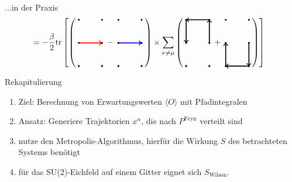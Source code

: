 \documentclass[ngerman]{beamer}
\begin{document}
\begin{frame}{...in der Praxis}
\begin{align*}
	&= -\frac{\beta}{2} \text{tr} \left[ \left( \;
	\begin{tikzpicture}[baseline=-0.5ex]
	\draw[->, very thick, red] (0,0) -> (1,0);
	\foreach \x in {0,...,1}
	{
		\foreach \y in {-1,...,1}
		{
			\fill[color=black] (\x,\y) circle (.04);
		}
	}
	\end{tikzpicture}
	\; - \;
	\begin{tikzpicture}[baseline=-0.5ex]
	\draw[->, very thick, blue] (0,0) -> (1,0);
	\foreach \x in {0,...,1}
	{
		\foreach \y in {-1,...,1}
		{
			\fill[color=black] (\x,\y) circle (.04);
		}
	}
	\end{tikzpicture}
	\; \right) \times \sum_{\nu \neq \mu} \left( \;
	\begin{tikzpicture}[baseline=-0.5ex]
	\draw[->, very thick] (1,0) -> (1,1);
	\draw[->, very thick] (1,1) -> (0,1);
	\draw[->, very thick] (0,1) -> (0,0);
	\foreach \x in {0,...,1}
	{
		\foreach \y in {-1,...,1}
		{
			\fill[color=black] (\x,\y) circle (.04);
		}
	}
	\end{tikzpicture}
	\; + \;
	\begin{tikzpicture}[baseline=-0.5ex]
	\draw[->, very thick] (1,0) -> (1,-1);
	\draw[->, very thick] (1,-1) -> (0,-1);
	\draw[->, very thick] (0,-1) -> (0,0);
	\foreach \x in {0,...,1}
	{
		\foreach \y in {-1,...,1}
		{
			\fill[color=black] (\x,\y) circle (.04);
		}
	}
	\end{tikzpicture}
	\; \right) \right]
	\end{align*}
\end{frame}

\begin{frame}{Rekapitulierung}
	\begin{enumerate}
		\item Ziel: Berechnung von Erwartungswerten $\langle O \rangle$ mit Pfadintegralen
		\item Ansatz: Generiere Trajektorien $x^\alpha$, die nach $P^\text{Feyn}$ verteilt sind
		\item nutze den Metropolis-Algorithmus, hierfür die Wirkung $S$ des betrachteten Systems benötigt
		\item für das SU(2)-Eichfeld auf einem Gitter eignet sich $S_\text{Wilson}$.
	\end{enumerate}
\end{frame}
\end{document}
